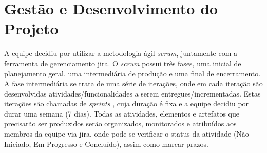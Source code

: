 \section{Gestão e Desenvolvimento do Projeto}
A equipe decidiu por utilizar a metodologia ágil \textit{\gls{scrum}}, juntamente com a ferramenta de gerenciamento \gls{jira}. O \textit{\gls{scrum}} possui três fases, uma inicial de planejamento geral, uma intermediária de produção e uma final de encerramento. A fase intermediária se trata de uma série de iterações, onde em cada iteração são desenvolvidas atividades/funcionalidades a serem entregues/incrementadas. Estas iterações são chamadas de \textit{\glspl{sprint}} \cite{sommerville}, cuja duração é fixa e a equipe decidiu por durar uma semana (7 dias). Todas as atividades, elementos e artefatos que precisarão ser produzidos serão organizados, monitorados e atribuídos aos membros da equipe via \gls{jira}, onde pode-se verificar o status da atividade (Não Iniciado, Em Progresso e Concluído), assim como marcar prazos.